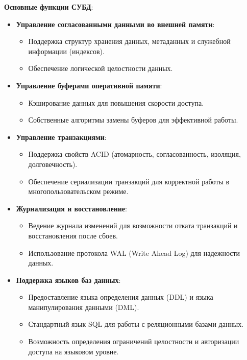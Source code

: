 \documentclass[a4paper,12pt]{article}
\begin{document}
\textbf{Основные функции СУБД}:

\begin{itemize}
    \item \textbf{Управление согласованными данными во внешней памяти}:
    \begin{itemize}
        \item Поддержка структур хранения данных, метаданных и служебной информации (индексов).
        \item Обеспечение логической целостности данных.
    \end{itemize}
    \item \textbf{Управление буферами оперативной памяти}:
    \begin{itemize}
        \item Кэширование данных для повышения скорости доступа.
        \item Собственные алгоритмы замены буферов для эффективной работы.
    \end{itemize}
    \item \textbf{Управление транзакциями}:
    \begin{itemize}
        \item Поддержка свойств ACID (атомарность, согласованность, изоляция, долговечность).
        \item Обеспечение сериализации транзакций для корректной работы в многопользовательском режиме.
    \end{itemize}
    \item \textbf{Журнализация и восстановление}:
    \begin{itemize}
        \item Ведение журнала изменений для возможности отката транзакций и восстановления после сбоев.
        \item Использование протокола WAL (Write Ahead Log) для надежности данных.
    \end{itemize}
    \item \textbf{Поддержка языков баз данных}:
    \begin{itemize}
        \item Предоставление языка определения данных (DDL) и языка манипулирования данными (DML).
        \item Стандартный язык SQL для работы с реляционными базами данных.
        \item Возможность определения ограничений целостности и авторизации доступа на языковом уровне.
    \end{itemize}
\end{itemize}
\end{document}
